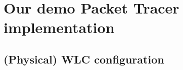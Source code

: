 

\clearpage %

\nocite{*}





\clearpage %
\appendix

\section{Our demo Packet Tracer implementation} \label{config}


\subsection{(Physical) WLC configuration} \label{configwlc}

\inputminted[fontsize=\tiny,linenos,breaklines]{text}{./wirelessimplementation/wlc.cisco}



